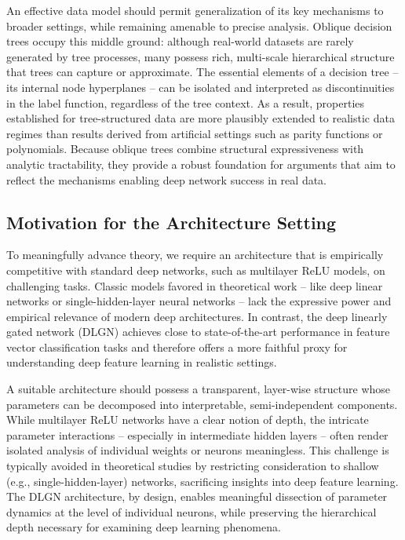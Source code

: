 \documentclass{article}
\theoremstyle{plain}
\theoremstyle{definition}
\theoremstyle{remark}
\newcommand{\1}{{\mathbf 1}}
\newcommand{\0}{{\mathbf 0}}
\renewcommand{\>}{{\rightarrow}}
\begin{document}
An effective data model should permit generalization of its key mechanisms to broader settings, while remaining amenable to precise analysis. Oblique decision trees occupy this middle ground: although real-world datasets are rarely generated by tree processes, many possess rich, multi-scale hierarchical structure that trees can capture or approximate. The essential elements of a decision tree -- its internal node hyperplanes -- can be isolated and interpreted as discontinuities in the label function, regardless of the tree context. As a result, properties established for tree-structured data are more plausibly extended to realistic data regimes than results derived from artificial settings such as parity functions or polynomials. Because oblique trees combine structural expressiveness with analytic tractability, they provide a robust foundation for arguments that aim to reflect the mechanisms enabling deep network success in real data.

\subsection{ Motivation for the Architecture Setting}

To meaningfully advance theory, we require an architecture that is empirically competitive with standard deep networks, such as multilayer ReLU models, on challenging tasks. Classic models favored in theoretical work -- like deep linear networks or single-hidden-layer neural networks -- lack the expressive power and empirical relevance of modern deep architectures. In contrast, the deep linearly gated network (DLGN) achieves close to state-of-the-art performance in feature vector classification tasks \cite{Banerjee+25} and therefore offers a more faithful proxy for understanding deep feature learning in realistic settings.

A suitable architecture should possess a transparent, layer-wise structure whose parameters can be decomposed into interpretable, semi-independent components. While multilayer ReLU networks have a clear notion of depth, the intricate parameter interactions -- especially in intermediate hidden layers -- often render isolated analysis of individual weights or neurons meaningless. This challenge is typically avoided in theoretical studies by restricting consideration to shallow (e.g., single-hidden-layer) networks, sacrificing insights into deep feature learning. The DLGN architecture, by design, enables meaningful dissection of parameter dynamics at the level of individual neurons, while preserving the hierarchical depth necessary for examining deep learning phenomena.
\end{document}
